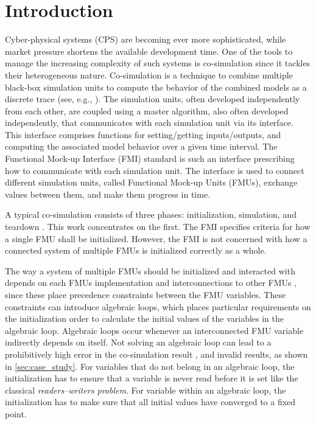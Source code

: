 \section{Introduction}\label{sc:introduction}
Cyber-physical systems (CPS) are becoming ever more sophisticated, while market pressure shortens the available development time. One of the tools to manage the increasing complexity of such systems is co-simulation since it tackles their heterogeneous nature. Co-simulation is a technique to combine multiple black-box simulation units to compute the behavior of the combined models as a discrete trace (see, e.g., \cite{Kubler2000, Gomes2018}). The simulation units, often developed independently from each other, are coupled using a master algorithm, also often developed independently, that communicates with each simulation unit via its interface. This interface comprises functions for setting/getting inputs/outputs, and computing the associated model behavior over a given time interval.
The Functional Mock-up Interface (FMI) standard \cite{Blochwitz2012, fmi_2019} is such an interface prescribing how to communicate with each simulation unit. The interface is used to connect different simulation units, called Functional Mock-up Units (FMUs), exchange values between them, and make them progress in time.

A typical co-simulation consists of three phases: initialization, simulation, and teardown \cite{Thule2019b}. This work concentrates on the first. The FMI specifies criteria for how a single FMU shall be initialized. However, the FMI is not concerned with how a connected system of multiple FMUs is initialized correctly as a whole.

The way a system of multiple FMUs should be initialized and interacted with depends on each FMUs implementation and interconnections to other FMUs \cite{gomes_lucio_vangheluwe_2019}, since these place precedence constraints between the FMU variables. These constraints can introduce algebraic loops, which places particular requirements on the initialization order to calculate the initial values of the variables in the algebraic loop\cite{Bastian2011a}. Algebraic loops occur whenever an interconnected FMU variable indirectly depends on itself. Not solving an algebraic loop can lead to a prohibitively high error in the co-simulation result \cite{Arnold2014}, and invalid results, as shown in \cref{sec:case_study}. For variables that do not belong in an algebraic loop, the initialization has to ensure that a variable is never read before it is set like the classical \textit{readers–writers problem}. For variable within an algebraic loop, the initialization has to make sure that all initial values have converged to a fixed point.

